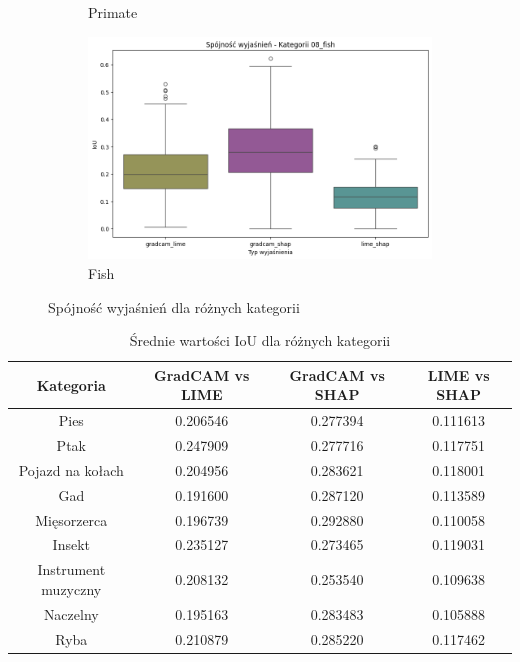 \begin{figure}
\begin{subfigure}[b]{0.3\textwidth}
		\caption{Primate}  \label{}
	\end{subfigure}
	\begin{subfigure}[b]{0.3\textwidth}
		\centering\includegraphics[width=.9\textwidth]{img/base_coherence_fish}
		\caption{Fish}  \label{}
	\end{subfigure}
	\caption{Spójność wyjaśnień dla różnych kategorii}
\end{figure}

\begin{table}[h]
	\centering
	\begin{tabular}{|c|c|c|c|}
		\hline
		\textbf{Kategoria}  & \textbf{GradCAM vs LIME} & \textbf{GradCAM vs SHAP} & \textbf{LIME vs SHAP} \\
		\hline
		Pies                & 0.206546                 & 0.277394                 & 0.111613              \\
		\hline
		Ptak                & 0.247909                 & 0.277716                 & 0.117751              \\
		\hline
		Pojazd na kołach    & 0.204956                 & 0.283621                 & 0.118001              \\
		\hline
		Gad                 & 0.191600                 & 0.287120                 & 0.113589              \\
		\hline
		Mięsorzerca         & 0.196739                 & 0.292880                 & 0.110058              \\
		\hline
		Insekt              & 0.235127                 & 0.273465                 & 0.119031              \\
		\hline
		Instrument muzyczny & 0.208132                 & 0.253540                 & 0.109638              \\
		\hline
		Naczelny            & 0.195163                 & 0.283483                 & 0.105888              \\
		\hline
		Ryba                & 0.210879                 & 0.285220                 & 0.117462              \\
		\hline
	\end{tabular}
	\caption{Średnie wartości IoU dla różnych kategorii}
	\label{tab:base_coherence_categories}
\end{table}

